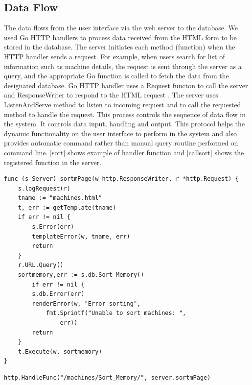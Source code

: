 \subsection{Data Flow}
The data flows from the user interface via the web server to the database. We used Go HTTP handlers to process data received from the HTML form to be stored in the database. The server initiates each method (function) when the HTTP handler sends a request. For example, when users search for list of information such as machine details, the request is sent through the server as a query, and the appropriate Go function is called to fetch the data from the designated database. Go HTTP handler uses a Request functon to call the server and  ResponseWriter to respond to the HTML request \cite{Gohttp}. The server uses ListenAndServe method to listen to incoming request and to call the requested method to handle the request. This process controls the sequence of data flow in the system. It controls data input, handling and output. This protocol helps the dynamic functionality on the user interface to perform in the system and also provides automatic command rather than manual query routine performed on command line. \autoref{sort} shows example of  handler function and \autoref{callsort} shows the registered function in the server.
\lstset{basicstyle=\footnotesize\ttfamily,breaklines=true}
\lstset{framextopmargin=50pt,frame=bottomline}
\begin{lstlisting}[caption=Sort Memory function in the handler, label=sort]
func (s Server) sortmPage(w http.ResponseWriter, r *http.Request) {
	s.logRequest(r)
	tname := "machines.html"
	t, err := getTemplate(tname)
	if err != nil {
		s.Error(err)
		templateError(w, tname, err)
		return
	}
	r.URL.Query()
	sortmemory,err := s.db.Sort_Memory()
		if err != nil {
		s.db.Error(err)
		renderError(w, "Error sorting",
			fmt.Sprintf("Unable to sort machines: ",
				err))
		return
	}
	t.Execute(w, sortmemory)
}
\end{lstlisting}

\lstset{basicstyle=\footnotesize\ttfamily,breaklines=true}
\lstset{framextopmargin=50pt,frame=bottomline}
\begin{lstlisting}[caption=Calling Sort Memory function, label=callsort]
http.HandleFunc("/machines/Sort_Memory/", server.sortmPage)
\end{lstlisting}

